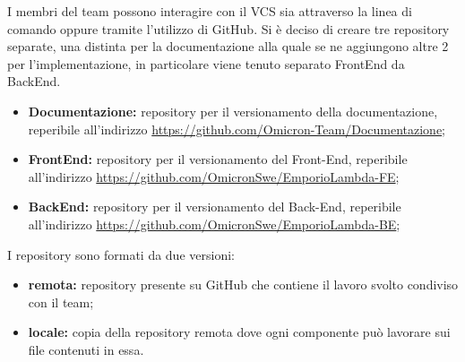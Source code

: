 I membri del team \Omicron{} possono interagire con il VCS sia attraverso la linea di comando oppure tramite l'utilizzo di GitHub. Si è deciso di creare tre repository separate, una distinta per la documentazione alla quale se ne aggiungono altre 2 per l'implementazione, in particolare viene tenuto separato FrontEnd da BackEnd.
\begin{itemize}
 \item \textbf{Documentazione:} repository per il versionamento della documentazione, reperibile all'indirizzo \url{https://github.com/Omicron-Team/Documentazione};
  \item \textbf{FrontEnd:} repository per il versionamento del Front-End, reperibile all'indirizzo \url{https://github.com/OmicronSwe/EmporioLambda-FE};
   \item \textbf{BackEnd:} repository per il versionamento del Back-End, reperibile all'indirizzo \url{https://github.com/OmicronSwe/EmporioLambda-BE};
\end{itemize}

I repository sono formati da due versioni:
\begin{itemize}
	\item \textbf{remota:} repository presente su GitHub che contiene il lavoro svolto condiviso con il team;
	\item \textbf{locale:} copia della repository remota dove ogni componente può lavorare sui file contenuti in essa.
\end{itemize}

